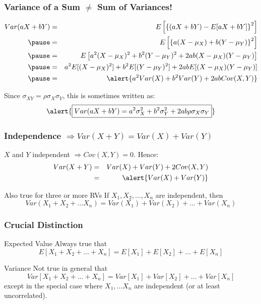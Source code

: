 \begin{frame}
\frametitle{Variance of a Sum $\neq$ Sum of Variances!}
\footnotesize
\begin{eqnarray*}
	Var(aX + bY) &=& E\left[\left\{\left( aX + bY\right) - E[aX + bY]\right\}^2  \right]\\ \pause
	&=& E\left[  \left\{a (X - \mu_X) + b(Y - \mu_Y)\right\}^2 \right]\\ \pause
	&=& E\left[a^2(X-\mu_X)^2 + b^2(Y-\mu_Y)^2 + 2ab(X-\mu_X)(Y-\mu_Y)  \right]\\ \pause
	&=&a^2E[(X-\mu_X)^2] + b^2 E[(Y-\mu_Y)^2] + 2ab E[(X-\mu_X)(Y-\mu_Y)]\\ \pause
	&=& \alert{a^2 Var(X) + b^2 Var(Y) + 2ab Cov(X,Y)}
\end{eqnarray*}


\vspace{3em}
\normalsize
Since $\sigma_{XY} = \rho\sigma_X \sigma_Y$, this is sometimes written as:
$$\alert{\boxed{Var(aX + bY) = a^2 \sigma_X^2 + b^2 \sigma_Y^2 + 2ab \rho \sigma_X \sigma_Y}}$$
\end{frame}
\begin{frame}
\frametitle{Independence $\Rightarrow Var(X+Y) = Var(X) + Var(Y)$}

$X$ and $Y$ independent $\Rightarrow Cov(X,Y)=0$. Hence:
\begin{eqnarray*}
	Var(X + Y) &=& Var(X) + Var(Y) + 2 Cov(X,Y)\\
			&=& \alert{Var(X) +Var(Y)}
\end{eqnarray*}


\begin{block}{Also true for three or more RVs}
If $X_1, X_2, \hdots, X_n$ are independent, then
	$$Var(X_1 + X_2 + \hdots X_n) = Var(X_1) + Var(X_2) + \hdots + Var(X_n)$$
\end{block}

\end{frame}
\begin{frame}
\frametitle{Crucial Distinction}
\begin{block}{Expected Value}
\alert{Always} true that
	$$E[X_1 + X_2 + \hdots + X_n] = E[X_1] + E[X_2] + \hdots + E[X_n]$$
\end{block}


\begin{block}{Variance}
\alert{Not true in general} that 
	$$Var[X_1 + X_2 + \hdots + X_n] = Var[X_1] + Var[X_2] + \hdots + Var[X_n]$$
except in the special case where $X_1, \hdots X_n$ are independent (or at least uncorrelated).
\end{block}
\end{frame}


